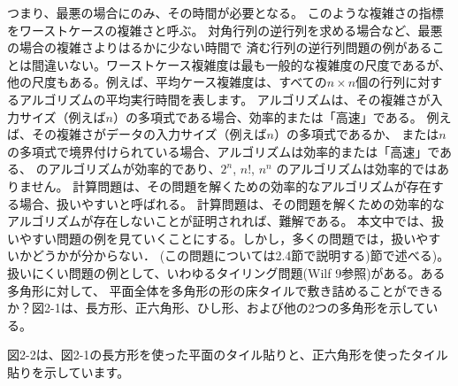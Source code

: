 
つまり、最悪の場合にのみ、その時間が必要となる。
このような複雑さの指標をワーストケースの複雑さと呼ぶ。
対角行列の逆行列を求める場合など、最悪の場合の複雑さよりはるかに少ない時間で
済む行列の逆行列問題の例があることは間違いない。ワーストケース複雑度は最も一般的な複雑度の尺度であるが、
他の尺度もある。例えば、平均ケース複雑度は、すべての$n\times n$個の行列に対するアルゴリズムの平均実行時間を表します。
アルゴリズムは、その複雑さが入力サイズ（例えば$n$）の多項式である場合、効率的または「高速」である。
例えば、その複雑さがデータの入力サイズ（例えば$n$）の多項式であるか、
または$n$の多項式で境界付けられている場合、アルゴリズムは効率的または「高速」である、
のアルゴリズムが効率的であり、$2^n$, $n!$, $n^n$ のアルゴリズムは効率的ではありません。
計算問題は、その問題を解くための効率的なアルゴリズムが存在する場合、扱いやすいと呼ばれる。
計算問題は、その問題を解くための効率的なアルゴリズムが存在しないことが証明されれば、難解である。
本文中では、扱いやすい問題の例を見ていくことにする。しかし，多くの問題では，扱いやすいかどうかが分からない．
(この問題については2.4節で説明する)節で述べる)。
扱いにくい問題の例として、いわゆるタイリング問題(Wilf 9参照)がある。ある多角形に対して、
平面全体を多角形の形の床タイルで敷き詰めることができるか？図2-1は、長方形、正六角形、ひし形、および他の2つの多角形を示している。

図2-2は、図2-1の長方形を使った平面のタイル貼りと、正六角形を使ったタイル貼りを示しています。